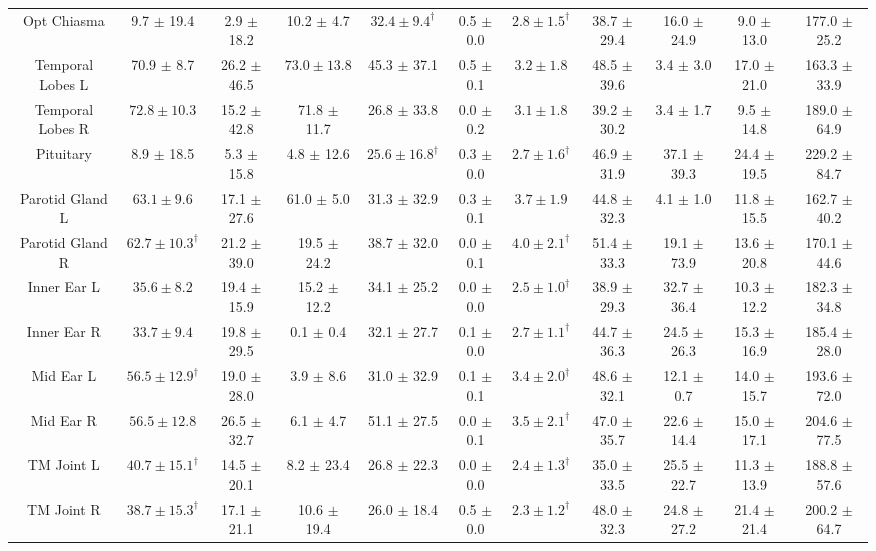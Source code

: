 \begin{table}[t!]
{\begin{subtable}{1\textwidth}
{\begin{tabular}{@{}ccccccccccc@{}}
Opt Chiasma&9.7 $\pm$ 19.4&2.9 $\pm$ 18.2&10.2 $\pm$ 4.7&$\bm{32.4\pm9.4}^\dagger$&0.5 $\pm$ 0.0&$\bm{2.8\pm1.5}^\dagger$&38.7 $\pm$ 29.4&16.0 $\pm$ 24.9&9.0 $\pm$ 13.0&177.0 $\pm$ 25.2 \\
Temporal Lobes L&70.9 $\pm$ 8.7&26.2 $\pm$ 46.5&$\bm{73.0\pm13.8}$&45.3 $\pm$ 37.1&0.5 $\pm$ 0.1&$\bm{3.2\pm1.8}$&48.5 $\pm$ 39.6&3.4 $\pm$ 3.0&17.0 $\pm$ 21.0&163.3 $\pm$ 33.9 \\
Temporal Lobes R&$\bm{72.8\pm10.3}$&15.2 $\pm$ 42.8&71.8 $\pm$ 11.7&26.8 $\pm$ 33.8&0.0 $\pm$ 0.2&$\bm{3.1\pm1.8}$&39.2 $\pm$ 30.2&3.4 $\pm$ 1.7&9.5 $\pm$ 14.8&189.0 $\pm$ 64.9 \\
Pituitary&8.9 $\pm$ 18.5&5.3 $\pm$ 15.8&4.8 $\pm$ 12.6&$\bm{25.6\pm16.8}^\dagger$&0.3 $\pm$ 0.0&$\bm{2.7\pm1.6}^\dagger$&46.9 $\pm$ 31.9&37.1 $\pm$ 39.3&24.4 $\pm$ 19.5&229.2 $\pm$ 84.7 \\
Parotid Gland L&$\bm{63.1\pm9.6}$&17.1 $\pm$ 27.6&61.0 $\pm$ 5.0&31.3 $\pm$ 32.9&0.3 $\pm$ 0.1&$\bm{3.7\pm1.9}$&44.8 $\pm$ 32.3&4.1 $\pm$ 1.0&11.8 $\pm$ 15.5&162.7 $\pm$ 40.2 \\
Parotid Gland R&$\bm{62.7\pm10.3}^\dagger$&21.2 $\pm$ 39.0&19.5 $\pm$ 24.2&38.7 $\pm$ 32.0&0.0 $\pm$ 0.1&$\bm{4.0\pm2.1}^\dagger$&51.4 $\pm$ 33.3&19.1 $\pm$ 73.9&13.6 $\pm$ 20.8&170.1 $\pm$ 44.6 \\
Inner Ear L&$\bm{35.6\pm8.2}$&19.4 $\pm$ 15.9&15.2 $\pm$ 12.2&34.1 $\pm$ 25.2&0.0 $\pm$ 0.0&$\bm{2.5\pm1.0}^\dagger$&38.9 $\pm$ 29.3&32.7 $\pm$ 36.4&10.3 $\pm$ 12.2&182.3 $\pm$ 34.8 \\
Inner Ear R&$\bm{33.7\pm9.4}$&19.8 $\pm$ 29.5&0.1 $\pm$ 0.4&32.1 $\pm$ 27.7&0.1 $\pm$ 0.0&$\bm{2.7\pm1.1}^\dagger$&44.7 $\pm$ 36.3&24.5 $\pm$ 26.3&15.3 $\pm$ 16.9&185.4 $\pm$ 28.0 \\
Mid Ear L&$\bm{56.5\pm12.9}^\dagger$&19.0 $\pm$ 28.0&3.9 $\pm$ 8.6&31.0 $\pm$ 32.9&0.1 $\pm$ 0.1&$\bm{3.4\pm2.0}^\dagger$&48.6 $\pm$ 32.1&12.1 $\pm$ 0.7&14.0 $\pm$ 15.7&193.6 $\pm$ 72.0 \\
Mid Ear R&$\bm{56.5\pm12.8}$&26.5 $\pm$ 32.7&6.1 $\pm$ 4.7&51.1 $\pm$ 27.5&0.0 $\pm$ 0.1&$\bm{3.5\pm2.1}^\dagger$&47.0 $\pm$ 35.7&22.6 $\pm$ 14.4&15.0 $\pm$ 17.1&204.6 $\pm$ 77.5 \\
TM Joint L&$\bm{40.7\pm15.1}^\dagger$&14.5 $\pm$ 20.1&8.2 $\pm$ 23.4&26.8 $\pm$ 22.3&0.0 $\pm$ 0.0&$\bm{2.4\pm1.3}^\dagger$&35.0 $\pm$ 33.5&25.5 $\pm$ 22.7&11.3 $\pm$ 13.9&188.8 $\pm$ 57.6 \\
TM Joint R&$\bm{38.7\pm15.3}^\dagger$&17.1 $\pm$ 21.1&10.6 $\pm$ 19.4&26.0 $\pm$ 18.4&0.5 $\pm$ 0.0&$\bm{2.3\pm1.2}^\dagger$&48.0 $\pm$ 32.3&24.8 $\pm$ 27.2&21.4 $\pm$ 21.4&200.2 $\pm$ 64.7 \\

\end{tabular}}
\end{subtable}}
\end{table}
